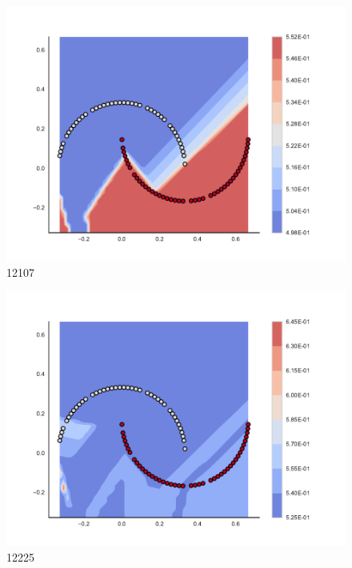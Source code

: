 \begin{subfigure}[b]{0.09\textwidth}
    \includegraphics[clip, trim=2.35cm 1.75cm 4.5cm 0cm,width=\textwidth]{img/convergence/12107.pdf}
    \caption{12107}
    \label{fig:convergence_12107}
\end{subfigure}
%
\begin{subfigure}[b]{0.09\textwidth}
    \includegraphics[clip, trim=2.35cm 1.75cm 4.5cm 0cm,width=\textwidth]{img/convergence/12225.pdf}
    \caption{12225}
    \label{fig:convergence_12225}
\end{subfigure}
%
